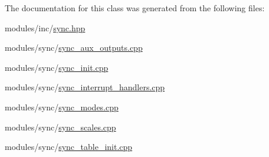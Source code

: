 The documentation for this class was generated from the following files\+:\begin{DoxyCompactItemize}
\item 
modules/inc/\mbox{\hyperlink{sync_8hpp}{sync.\+hpp}}\item 
modules/sync/\mbox{\hyperlink{sync__aux__outputs_8cpp}{sync\+\_\+aux\+\_\+outputs.\+cpp}}\item 
modules/sync/\mbox{\hyperlink{sync__init_8cpp}{sync\+\_\+init.\+cpp}}\item 
modules/sync/\mbox{\hyperlink{sync__interrupt__handlers_8cpp}{sync\+\_\+interrupt\+\_\+handlers.\+cpp}}\item 
modules/sync/\mbox{\hyperlink{sync__modes_8cpp}{sync\+\_\+modes.\+cpp}}\item 
modules/sync/\mbox{\hyperlink{sync__scales_8cpp}{sync\+\_\+scales.\+cpp}}\item 
modules/sync/\mbox{\hyperlink{sync__table__init_8cpp}{sync\+\_\+table\+\_\+init.\+cpp}}\end{DoxyCompactItemize}
